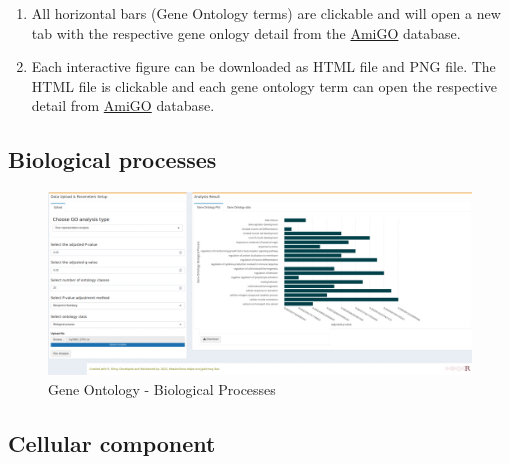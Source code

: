 \documentclass[
  a4paper,
  DIV=11,
  numbers=noendperiod,
  oneside,
  open=any]{scrreport}
\providecommand{\tightlist}{%
  \setlength{\itemsep}{0pt}\setlength{\parskip}{0pt}}\usepackage{longtable,booktabs,array}
\begin{document}
\begin{tcolorbox}[enhanced jigsaw, coltitle=black, colback=white, title=\textcolor{quarto-callout-note-color}{\faInfo}\hspace{0.5em}{Note}, leftrule=.75mm, titlerule=0mm, colframe=quarto-callout-note-color-frame, toprule=.15mm, opacityback=0, arc=.35mm, breakable, rightrule=.15mm, colbacktitle=quarto-callout-note-color!10!white, bottomtitle=1mm, opacitybacktitle=0.6, left=2mm, bottomrule=.15mm, toptitle=1mm]

\begin{enumerate}
\def\labelenumi{\arabic{enumi}.}
\tightlist
\item
  All horizontal bars (Gene Ontology terms) are clickable and will open
  a new tab with the respective gene onlogy detail from the
  \href{http://amigo.geneontology.org/amigo}{AmiGO} database.
\item
  Each interactive figure can be downloaded as HTML file and PNG file.
  The HTML file is clickable and each gene ontology term can open the
  respective detail from
  \href{http://amigo.geneontology.org/amigo}{AmiGO} database.
\end{enumerate}

\end{tcolorbox}

\subsection{Biological processes}\label{biological-processes}

\begin{figure}[H]

{\centering \includegraphics{images/GO-BP.png}

}

\caption{Gene Ontology - Biological Processes}

\end{figure}%

\subsection{Cellular component}\label{cellular-component}
\end{document}

